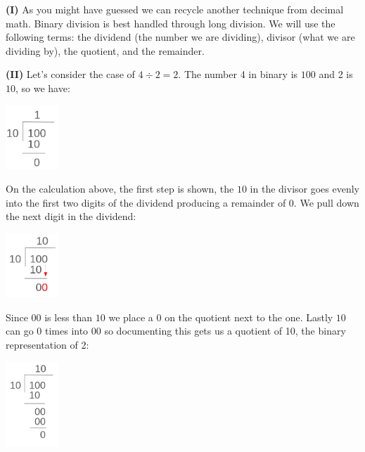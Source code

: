 \documentclass[12pt]{article}
\begin{document}
	\newpage
		\par{}
	\newline
	\newline
	\begin{minipage}[t]{.5\linewidth}
		\par\noindent \textbf{(I)} As you might have guessed we can recycle another technique from decimal math. Binary division is best handled through long division. We will use the following terms: the dividend (the number we are dividing), divisor (what we are dividing by), the quotient, and the remainder.
		\newline
		\par\noindent \textbf{(II)} Let's consider the case of \(4 \div 2 = 2\). The number 4 in binary is \(100\) and 2 is \(10\), so we have:
		
		\begin{center}
			\includegraphics[width=2.0cm]{bin-div-1.png}
		\end{center}
	
		\par\noindent On the calculation above, the first step is shown, the \(10\) in the divisor goes evenly into the first two digits of the dividend producing a remainder of 0. We pull down the next digit in the dividend:
		
		\begin{center}
			\includegraphics[width=2.0cm]{bin-div-2.png}
		\end{center}
	
		\par\noindent Since \(00\) is less than \(10\) we place a 0 on the quotient next to the one. Lastly \(10\) can go 0 times into \(00\) so documenting this gets us a quotient of 10, the binary representation of 2:
		
		\begin{center}
			\includegraphics[width=2.0cm]{bin-div-6.png}
		\end{center}
	
	\end{minipage}
\end{document}
